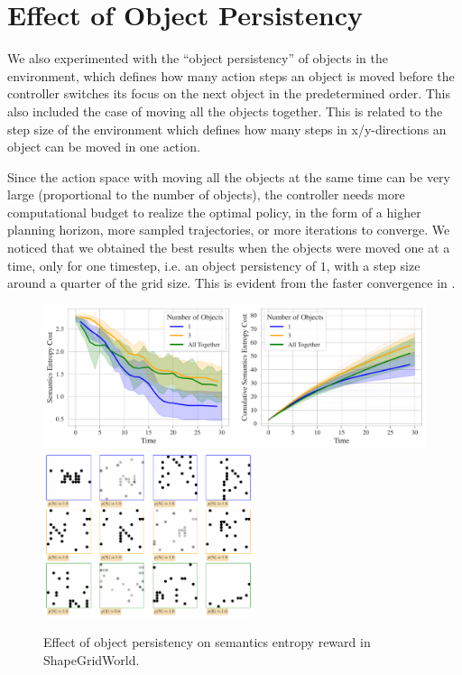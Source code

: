 \section{Effect of Object Persistency}
\label{sec:sgw-persistency}

We also experimented with the ``object persistency'' of objects in the environment, which defines how many action steps an object is moved before the controller switches its focus on the next object in the predetermined order.
This also included the case of moving all the objects together.
This is related to the step size of the environment which defines how many steps in x/y-directions an object can be moved in one action.

Since the action space with moving all the objects at the same time can be very large (proportional to the number of objects), the controller needs more computational budget to realize the optimal policy, in the form of a higher planning horizon, more sampled trajectories, or more iterations to converge.
We noticed that we obtained the best results when the objects were moved one at a time, only for one timestep, i.e. an object persistency of \(1\), with a step size around a quarter of the grid size.
This is evident from the faster convergence in .

\begin{figure}[H]
    \centering
    \includegraphics[width=\textwidth]{images/object_persistency_comparison_sgw.pdf}\vspace{6pt}
    \includegraphics[width=0.55\textwidth]{images/object_persistency_samples_sgw.pdf}\vspace{3pt}
    \caption{Effect of object persistency on semantics entropy reward in ShapeGridWorld.}
    \label{fig:object-persistency-sgw}
\end{figure}


